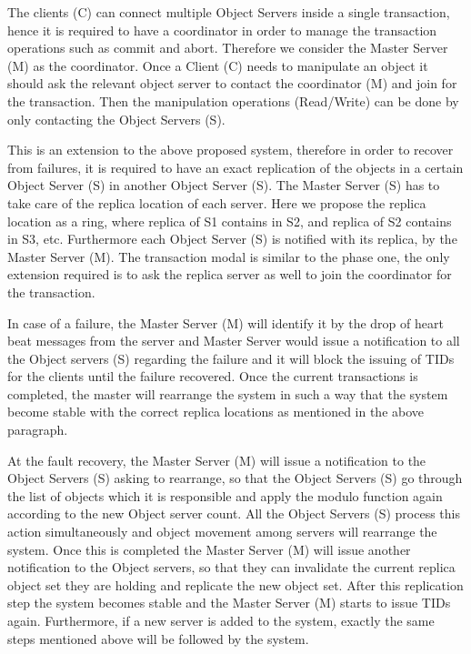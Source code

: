 \documentclass[times, 10pt,twocolumn]{article}
\begin{document}
The clients (C) can connect multiple Object Servers inside a single transaction, hence it is required to have a coordinator in order to manage the transaction operations such as commit and abort.
Therefore we consider the Master Server (M) as the coordinator. Once a Client (C) needs to manipulate an object it should ask the relevant object server to contact the coordinator (M) and join 
for the transaction. Then the manipulation operations (Read/Write) can be done by only contacting the Object Servers (S).

\label{subsec:phase2}
This is an extension to the above proposed system, therefore in order to recover from failures, it is required to have an exact replication of the objects in a certain Object Server (S) in 
another Object Server (S). The Master Server (S) has to take care of the replica location of each server. Here we propose the replica location as a ring, where replica of S1 contains in S2, 
and replica of S2 contains in S3, etc. Furthermore each Object Server (S) is notified with its replica, by the Master Server (M). The transaction modal is similar to the phase one, the
only extension required is to ask the replica server as well to join the coordinator for the transaction.

In case of a failure, the Master Server (M) will identify it by the drop of heart beat messages from the server and Master Server would issue a notification to all the Object servers (S) 
regarding the failure and it will block the issuing of TIDs for the clients until the failure recovered. Once the current transactions is completed, the master will rearrange the system in
such a way that the system become stable with the correct replica locations as mentioned in the above paragraph.

At the fault recovery, the Master Server (M) will issue a notification to the Object Servers (S) asking to rearrange, so that the Object Servers (S) go through the list of objects which it 
is responsible and apply the modulo function again according to the new Object server count. All the Object Servers (S) process this action simultaneously and object movement among servers 
will rearrange the system. Once this is completed the Master Server (M) will issue another notification to the Object servers, so that they can invalidate the current replica object set they 
are holding and replicate the new object set. After this replication step the system becomes stable and the Master Server (M) starts to issue TIDs again. Furthermore, if a new server is added to
the system, exactly the same steps mentioned above will be followed by the system.
\end{document}
